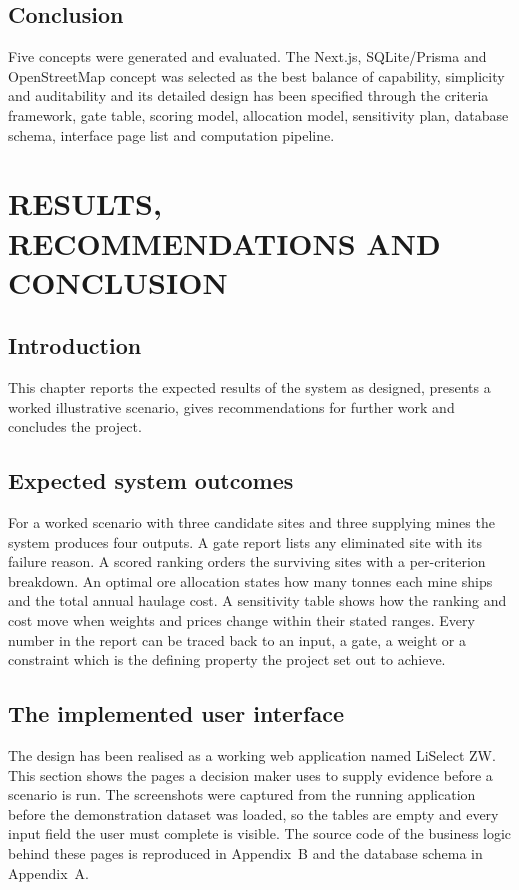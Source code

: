 \documentclass[12pt,a4paper]{report}
\begin{document}
\section{Conclusion}
Five concepts were generated and evaluated. The Next.js, SQLite/Prisma
and OpenStreetMap concept was selected as the best balance of
capability, simplicity and auditability and its detailed design has
been specified through the criteria framework, gate table, scoring
model, allocation model, sensitivity plan, database schema, interface
page list and computation pipeline.

\chapter{RESULTS, RECOMMENDATIONS AND CONCLUSION}

\section{Introduction}
This chapter reports the expected results of the system as designed,
presents a worked illustrative scenario, gives recommendations for
further work and concludes the project.

\section{Expected system outcomes}
For a worked scenario with three candidate sites and three supplying
mines the system produces four outputs. A gate report lists any
eliminated site with its failure reason. A scored ranking orders the
surviving sites with a per-criterion breakdown. An optimal ore
allocation states how many tonnes each mine ships and the total annual
haulage cost. A sensitivity table shows how the ranking and cost move
when weights and prices change within their stated ranges. Every
number in the report can be traced back to an input, a gate, a weight
or a constraint which is the defining property the project set out to
achieve.

\section{The implemented user interface}
The design has been realised as a working web application named
LiSelect\,\textperiodcentered\,ZW. This section shows the pages a
decision maker uses to supply evidence before a scenario is run. The
screenshots were captured from the running application before the
demonstration dataset was loaded, so the tables are empty and every
input field the user must complete is visible. The source code of the
business logic behind these pages is reproduced in Appendix~B and the
database schema in Appendix~A.
\end{document}
